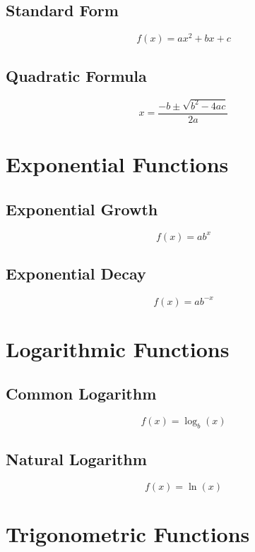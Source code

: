 \documentclass[12pt]{book}
\begin{document}
\subsection{Standard Form}
\begin{equation}
    f(x) = ax^2 + bx + c
\end{equation}

\subsection{Quadratic Formula}
\begin{equation}
	x = \frac{-b \pm \sqrt{b^2 - 4ac}}{2a}
\end{equation}

\section{Exponential Functions}
\subsection{Exponential Growth}
\begin{equation}
    f(x) = ab^x
\end{equation}

\subsection{Exponential Decay}
\begin{equation}
    f(x) = ab^{-x}
\end{equation}

\section{Logarithmic Functions}
\subsection{Common Logarithm}
\begin{equation}
    f(x) = \log_b(x)
\end{equation}

\subsection{Natural Logarithm}
\begin{equation}
    f(x) = \ln(x)
\end{equation}

\section{Trigonometric Functions}
\end{document}
